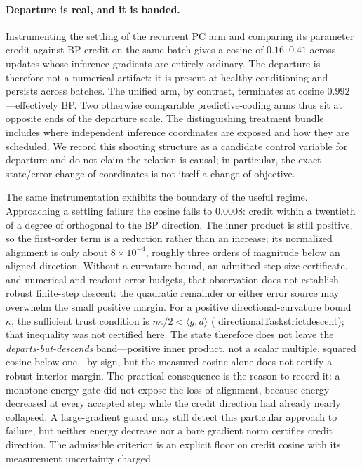 \documentclass[11pt]{article}
\newcommand{\leanname}[1]{{\scriptsize\ttfamily
  \def\_{\textunderscore\allowbreak}#1}}
\begin{document}
\paragraph{Departure is real, and it is banded.}
Instrumenting the settling of the recurrent PC arm and comparing its parameter credit
against BP credit on the same batch gives a cosine of $0.16$--$0.41$ across updates
whose inference gradients are entirely ordinary. The departure is therefore not a
numerical artifact: it is present at healthy conditioning and persists across batches.
The unified arm, by contrast, terminates at cosine $0.992$---effectively BP. Two
otherwise comparable predictive-coding arms thus sit at opposite ends of the departure
scale. The distinguishing treatment bundle includes where independent inference
coordinates are exposed and how they are scheduled. We record this shooting structure
as a candidate control variable for departure and do not claim the relation is causal;
in particular, the exact state/error change of coordinates is not itself a change of
objective.

The same instrumentation exhibits the boundary of the useful regime. Approaching a
settling failure the cosine falls to $0.0008$: credit within a twentieth of a degree of
orthogonal to the BP direction. The inner product is still positive, so the first-order
term is a reduction rather than an increase; its normalized alignment is only about
$8\times10^{-4}$, roughly three orders of magnitude below an aligned direction. Without
a curvature bound, an admitted-step-size certificate, and numerical and readout error
budgets, that observation does not establish robust finite-step descent: the quadratic
remainder or either error source may overwhelm the small positive margin. For a positive
directional-curvature bound $\kappa$, the sufficient trust condition is
$\eta\kappa/2<\langle g,d\rangle$
(\leanname{directionalTask\_strict\_descent}); that inequality was not certified here.
The state
therefore does not leave the \emph{departs-but-descends} band---positive inner product,
not a scalar multiple, squared cosine below one---by sign, but the measured cosine alone
does not certify a robust interior margin. The practical consequence is the reason to
record it: a monotone-energy gate did not expose the loss of alignment, because energy
decreased at every accepted step while the credit direction had already nearly collapsed.
A large-gradient guard may still detect this particular approach to failure, but neither
energy decrease nor a bare gradient norm certifies credit direction. The admissible
criterion is an explicit floor on credit cosine with its measurement uncertainty charged.
\end{document}

